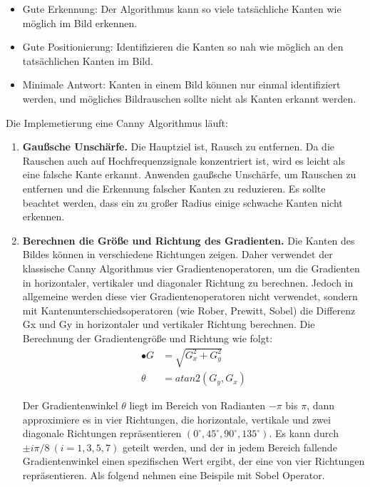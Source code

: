\begin{itemize}

\item Gute Erkennung: Der Algorithmus kann so viele tatsächliche Kanten wie möglich im Bild erkennen.
\item Gute Positionierung: Identifizieren die Kanten so nah wie möglich an den tatsächlichen Kanten im Bild.
\item Minimale Antwort: Kanten in einem Bild können nur einmal identifiziert werden, und mögliches Bildrauschen sollte nicht als Kanten erkannt werden.

\end{itemize}

Die Implemetierung eine Canny Algorithmus läuft:

\begin{enumerate}
	\item \textbf{Gaußsche Unschärfe.} Die Hauptziel ist, Rausch zu entfernen. Da die Rauschen auch auf Hochfrequenzsignale konzentriert ist, wird es leicht als eine falsche Kante erkannt. Anwenden gaußsche Unschärfe, um Rauschen zu entfernen und die Erkennung falscher Kanten zu reduzieren. Es sollte beachtet werden, dass ein zu großer Radius einige schwache Kanten nicht erkennen.
	\item \textbf{Berechnen die Größe und Richtung des Gradienten.} Die Kanten des Bildes können in verschiedene Richtungen zeigen. Daher verwendet der klassische Canny Algorithmus vier Gradientenoperatoren, um die Gradienten in horizontaler, vertikaler und diagonaler Richtung zu berechnen. Jedoch in allgemeine werden diese vier Gradientenoperatoren nicht verwendet, sondern mit Kantenunterschiedsoperatoren (wie Rober, Prewitt, Sobel) die Differenz Gx und Gy in horizontaler und vertikaler Richtung berechnen. Die Berechnung der Gradientengröße und Richtung wie folgt:	
\begin{equation}
\begin{split}
•  G   & = \sqrt{G_x^{2} + G_y^{2}} \\
\theta & = atan2(G_y,G_x)
\end{split}
\end{equation}

Der Gradientenwinkel $ \theta $ liegt im Bereich von Radianten $ -\pi $ bis $ \pi $, dann approximiere es in vier Richtungen, die horizontale, vertikale und zwei diagonale Richtungen repräsentieren    $(0^{\circ}, 45^{\circ}, 90^{\circ}, 135^{\circ}) $. Es kann durch $  \pm i \pi / 8\ (i =1, 3, 5, 7) $ geteilt werden, und der in jedem Bereich fallende Gradientenwinkel einen spezifischen Wert ergibt, der eine von vier Richtungen repräsentieren. Als folgend nehmen eine Beispile mit Sobel Operator.


\end{enumerate}
